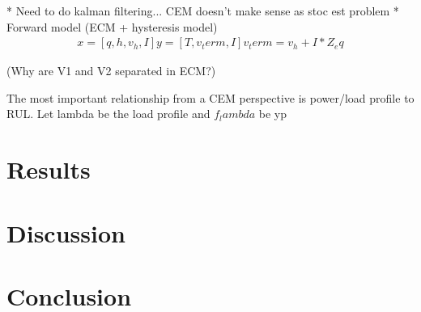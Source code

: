 * Need to do kalman filtering... CEM doesn't make sense as stoc est problem
* Forward model (ECM + hysteresis model)
\begin{align}
    x = [q, h, v_h, I]
    y = [T, v_term, I]
    v_term = v_h + I * Z_eq
\end{align}



(Why are V1 and V2 separated in ECM?)

The most important relationship from a CEM perspective is power/load profile to RUL. Let lambda be the load profile and $f_lambda$ be yp


\section{Results}

\section{Discussion}

\section{Conclusion}
